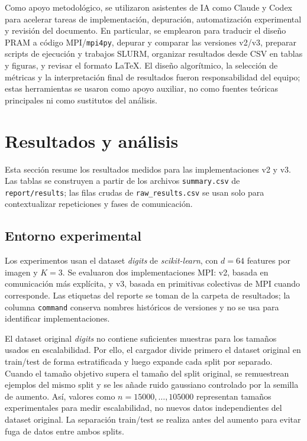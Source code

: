 \documentclass[11pt,a4paper]{article}
\begin{document}
Como apoyo metodológico, se utilizaron asistentes de IA como Claude y Codex~\cite{claude,codex}
para acelerar tareas de implementación, depuración, automatización experimental y revisión del
documento. En particular, se emplearon para traducir el diseño PRAM a código MPI/\texttt{mpi4py},
depurar y comparar las versiones v2/v3, preparar scripts de ejecución y trabajos SLURM,
organizar resultados desde CSV en tablas y figuras, y revisar el formato LaTeX. El diseño
algorítmico, la selección de métricas y la interpretación final de resultados fueron
responsabilidad del equipo; estas herramientas se usaron como apoyo auxiliar, no como fuentes
teóricas principales ni como sustitutos del análisis.

\section{Resultados y análisis}

Esta sección resume los resultados medidos para las implementaciones v2 y v3. Las tablas se
construyen a partir de los archivos \texttt{summary.csv} de \texttt{report/results}; las filas
crudas de \texttt{raw\_results.csv} se usan solo para contextualizar repeticiones y fases de
comunicación.

\subsection{Entorno experimental}

Los experimentos usan el dataset \textit{digits} de \textit{scikit-learn}, con $d=64$ features
por imagen y $K=3$. Se evaluaron dos implementaciones MPI: v2, basada en comunicación más
explícita, y v3, basada en primitivas colectivas de MPI cuando corresponde. Las etiquetas del
reporte se toman de la carpeta de resultados; la columna \texttt{command} conserva nombres
históricos de versiones y no se usa para identificar implementaciones.

El dataset original \textit{digits} no contiene suficientes muestras para los tamaños usados en
escalabilidad. Por ello, el cargador divide primero el dataset original en train/test de forma
estratificada y luego expande cada split por separado. Cuando el tamaño objetivo supera el tamaño
del split original, se remuestrean ejemplos del mismo split y se les añade ruido gaussiano
controlado por la semilla de aumento. Así, valores como $n=15000,\ldots,105000$ representan
tamaños experimentales para medir escalabilidad, no nuevos datos independientes del dataset
original. La separación train/test se realiza antes del aumento para evitar fuga de datos entre
ambos splits.
\end{document}
